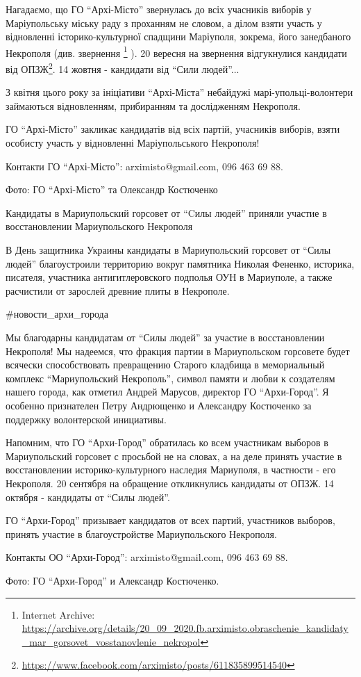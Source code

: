Нагадаємо, що ГО \enquote{Архі-Місто} звернулась до всіх учасників виборів у
Маріупольську міську раду з проханням не словом, а ділом взяти участь у
відновленні історико-культурної спадщини Маріуполя, зокрема, його занедбаного
Некрополя (див. звернення%
\footnote{Internet Archive: \url{https://archive.org/details/20_09_2020.fb.arximisto.obraschenie_kandidaty_mar_gorsovet_vosstanovlenie_nekropol}}
). 20 вересня на звернення
відгукнулися кандидати від ОПЗЖ\footnote{\url{https://www.facebook.com/arximisto/posts/611835899514540}}. 14 жовтня -
кандидати від \enquote{Сили людей}...

З квітня цього року за ініціативи \enquote{Архі-Міста} небайдужі марі\hyp{}упольці-волонтери
займаються відновленням, прибиранням та дослідженням Некрополя.

ГО \enquote{Архі-Місто} закликає кандидатів від всіх партій, учасників виборів, взяти особисту участь у відновленні Маріупольського Некрополя!

Контакти ГО \enquote{Архі-Місто}: arximisto@gmail.com, 096 463 69 88.

Фото: ГО \enquote{Архі-Місто} та Олександр Костюченко 

Кандидаты в Мариупольский горсовет от \enquote{Cилы людей} приняли участие в восстановлении Мариупольского Некрополя

В День защитника Украины кандидаты в Мариупольский горсовет от \enquote{Силы людей}
благоустроили территорию вокруг памятника Николая Фененко, историка, писателя,
участника антигитлеровского подполья ОУН в Мариуполе, а также расчистили от
зарослей древние плиты в Некрополе. 

\#новости\_архи\_города

Мы благодарны кандидатам от \enquote{Силы людей} за участие в восстановлении Некрополя!
Мы надеемся, что фракция партии в Мариупольском горсовете будет всячески
способствовать превращению Старого кладбища в мемориальный комплекс
\enquote{Мариупольский Некрополь}, символ памяти и любви к создателям нашего города,
как отметил Андрей Марусов, директор ГО \enquote{Архи-Город}. Я особенно признателен
Петру Андрющенко и Александру Костюченко за поддержку волонтерской инициативы.

Напомним, что ГО \enquote{Архи-Город} обратилась ко всем участникам выборов в
Мариупольский горсовет с просьбой не на словах, а на деле принять участие в
восстановлении историко-культурного наследия Мариуполя, в частности - его
Некрополя. 20 сентября на обращение откликнулись кандидаты от ОПЗЖ. 14 октября
- кандидаты от \enquote{Силы людей}.

ГО \enquote{Архи-Город} призывает кандидатов от всех партий, участников выборов,
принять участие в благоустройстве Мариупольского Некрополя.

Контакты ОО \enquote{Архи-Город}: arximisto@gmail.com, 096 463 69 88.

Фото: ГО \enquote{Архи-Город} и Александр Костюченко.
